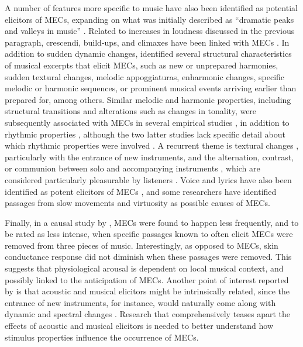 A number of features more specific to music have also been identified as potential elicitors of MECs, expanding on what was initially described as ``dramatic peaks and valleys in music'' \parencite[p. 127]{goldstein1980}. Related to increases in loudness discussed in the previous paragraph, crescendi, build-ups, and climaxes have been linked with MECs \parencite{auricchio2017, bannister2018, bannister2020a, panksepp1995, polo2017, solberg2019}. In addition to sudden dynamic changes, \textcite{sloboda1991} identified several structural characteristics of musical excerpts that elicit MECs, such as new or unprepared harmonies, sudden textural changes, melodic appoggiaturas, enharmonic changes, specific melodic or harmonic sequences, or prominent musical events arriving earlier than prepared for, among others. Similar melodic and harmonic properties, including structural transitions and alterations such as changes in tonality, were subsequently associated with MECs in several empirical studies \parencite{auricchio2017, bannister2018, bannister2020a, guhn2007, mlejnek2013, schurtz2012}, in addition to rhythmic properties \parencite{schurtz2012, solberg2019}, although the two latter studies lack specific detail about which rhythmic properties were involved \parencite[for a hypothesis about optimal tempo, see][]{mcevilly1999}. A recurrent theme is textural changes \parencite{auricchio2017, polo2017, sloboda1991, solberg2019}, particularly with the entrance of new instruments, and the alternation, contrast, or communion between solo and accompanying instruments \parencite{auricchio2017, bannister2018, bannister2020a, goodchild2019, guhn2007, mlejnek2013}, which are considered particularly pleasurable by listeners \parencite{grewe2007}. Voice and lyrics have also been identified as potent elicitors of MECs \parencite{bannister2020a, schurtz2012}, and some researchers have identified passages from slow movements \parencite{guhn2007} and virtuosity \parencite{mlejnek2013} as possible causes of MECs.

Finally, in a causal study by \textcite{bannister2018}, MECs were found to happen less frequently, and to be rated as less intense, when specific passages known to often elicit MECs were removed from three pieces of music. Interestingly, as opposed to MECs, skin conductance response did not diminish when these passages were removed. This suggests that physiological arousal is dependent on local musical context, and possibly linked to the anticipation of MECs. Another point of interest reported by \textcite{bannister2018} is that acoustic and musical elicitors might be intrinsically related, since the entrance of new instruments, for instance, would naturally come along with dynamic and spectral changes \parencite[see also][]{auricchio2017}. Research that comprehensively teases apart the effects of acoustic and musical elicitors is needed to better understand how stimulus properties influence the occurrence of MECs.

